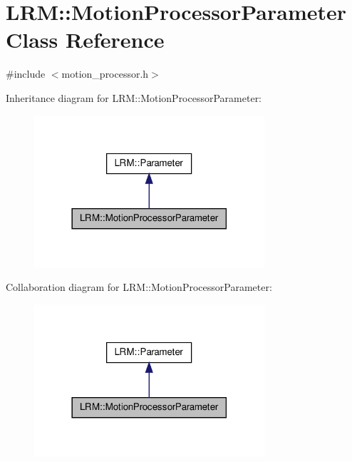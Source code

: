 \hypertarget{classLRM_1_1MotionProcessorParameter}{\section{\-L\-R\-M\-:\-:\-Motion\-Processor\-Parameter \-Class \-Reference}
\label{classLRM_1_1MotionProcessorParameter}
}


{\ttfamily \#include $<$motion\-\_\-processor.\-h$>$}



\-Inheritance diagram for \-L\-R\-M\-:\-:\-Motion\-Processor\-Parameter\-:\nopagebreak
\begin{figure}[H]
\begin{center}
\leavevmode
\includegraphics[width=242pt]{classLRM_1_1MotionProcessorParameter__inherit__graph}
\end{center}
\end{figure}


\-Collaboration diagram for \-L\-R\-M\-:\-:\-Motion\-Processor\-Parameter\-:\nopagebreak
\begin{figure}[H]
\begin{center}
\leavevmode
\includegraphics[width=242pt]{classLRM_1_1MotionProcessorParameter__coll__graph}
\end{center}
\end{figure}
